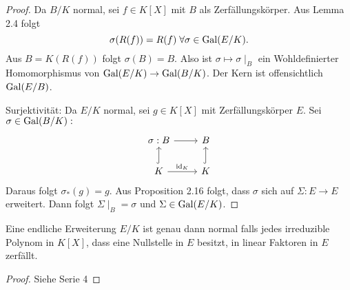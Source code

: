 \begin{proof}
	Da $B / K$ normal, sei $f \in K[X]$ mit $B$ als Zerfällungskörper.
	Aus Lemma 2.4 folgt
	\[
		\sigma(R(f)) = R(f) \forall  \sigma \in \gal(E / K)
	.\] 
	Aus $B = K(R(f))$ folgt $\sigma(B) = B$. Also ist $\sigma \mapsto \sigma \mid_{B}$ ein Wohldefinierter Homomorphismus von $\operatorname{Gal}(E / K) \to \operatorname{Gal}(B / K)$.
	Der Kern ist offensichtlich $\operatorname{Gal}(E / B)$.

	Surjektivität: Da $E / K$ normal, sei $g \in K[X]$ mit Zerfällungskörper $E$.
	Sei $\sigma \in \operatorname{Gal}(B / K): $ 
	\[
		\begin{tikzcd}
			\sigma: B \arrow[r]                          & B                 \\
        	K \arrow[r, "\id_K"] \arrow[u, hook] & K \arrow[u, hook]
		\end{tikzcd}
	\]
	Daraus folgt $\sigma_{*}(g) = g$. Aus Proposition 2.16 folgt, dass $\sigma$ sich auf $\Sigma: E \to E$ erweitert.
	Dann folgt $\Sigma \mid_{B} = \sigma$ und $\Sigma \in \operatorname{Gal}(E / K)$.
\end{proof}

\begin{theorem}
	Eine endliche Erweiterung $E / K$ ist genau dann normal falls jedes irreduzible Polynom in $K[X]$,
	dass eine Nullstelle in $E$ besitzt, in linear Faktoren in $E$ zerfällt.
\end{theorem}

\begin{proof}
	Siehe Serie 4
\end{proof}

































